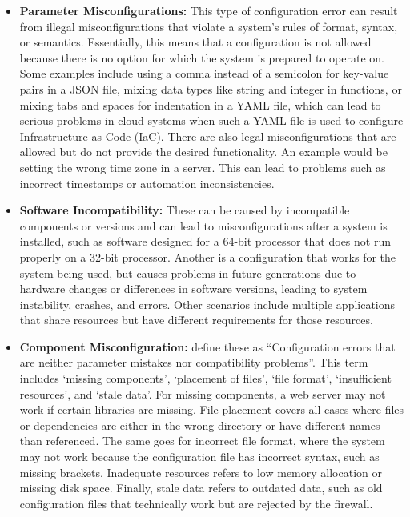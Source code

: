 \documentclass[english,bachelor]{swsLeipzig}
\begin{document}
\begin{itemize}
  \item \textbf{Parameter Misconfigurations:} This type of configuration error can result from illegal 
  misconfigurations that violate a system's rules of format, syntax, or semantics. Essentially, this means that 
  a configuration is not allowed because there is no option for which the system is prepared to operate on. Some 
  examples include using a comma instead of a semicolon for key-value pairs in a JSON file, mixing data types 
  like string and integer in functions, or mixing tabs and spaces for indentation in a YAML file, which can lead 
  to serious problems in cloud systems when such a YAML file is used to configure Infrastructure as Code (IaC). 
  There are also legal misconfigurations that are allowed but do not provide the desired functionality. An example 
  would be setting the wrong time zone in a server. This can lead to problems such as incorrect timestamps or 
  automation inconsistencies.

  \item \textbf{Software Incompatibility:} These can be caused by incompatible components or versions and can 
  lead to misconfigurations after a system is installed, such as software designed for a 64-bit processor that 
  does not run properly on a 32-bit processor. Another is a configuration that works for the system being used, 
  but causes problems in future generations due to hardware changes or differences in software versions, leading 
  to system instability, crashes, and errors. Other scenarios include multiple applications that share resources 
  but have different requirements for those resources.

  \item \textbf{Component Misconfiguration:} \citet{yinma:2011} define these as ``Configuration errors 
  that are neither parameter mistakes nor compatibility problems''. This term includes `missing components', 
  `placement of files', `file format', `insufficient resources', and `stale data'. For missing components, a web 
  server may not work if certain libraries are missing. File placement covers all cases where files or dependencies 
  are either in the wrong directory or have different names than referenced. The same goes for incorrect file 
  format, where the system may not work because the configuration file has incorrect syntax, such as missing 
  brackets. Inadequate resources refers to low memory allocation or missing disk space. Finally, stale data refers 
  to outdated data, such as old configuration files that technically work but are rejected by the firewall.
\end{itemize}
\end{document}
